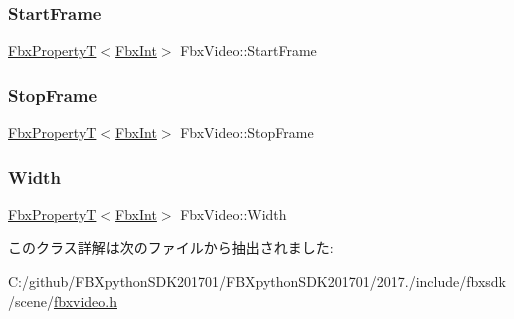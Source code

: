 \subsubsection{\texorpdfstring{Start\+Frame}{StartFrame}}
{\footnotesize\ttfamily \hyperlink{class_fbx_property_t}{Fbx\+PropertyT}$<$\hyperlink{fbxtypes_8h_a088fa96de3b0b3ea69f0f6afef525dfb}{Fbx\+Int}$>$ Fbx\+Video\+::\+Start\+Frame}

\mbox{\label{class_fbx_video_aab5d673b818ce8a797ac47851a34e996}} 
\subsubsection{\texorpdfstring{Stop\+Frame}{StopFrame}}
{\footnotesize\ttfamily \hyperlink{class_fbx_property_t}{Fbx\+PropertyT}$<$\hyperlink{fbxtypes_8h_a088fa96de3b0b3ea69f0f6afef525dfb}{Fbx\+Int}$>$ Fbx\+Video\+::\+Stop\+Frame}

\mbox{\label{class_fbx_video_a9f1d9f9874ac3a9274a754cfb311fc30}} 
\subsubsection{\texorpdfstring{Width}{Width}}
{\footnotesize\ttfamily \hyperlink{class_fbx_property_t}{Fbx\+PropertyT}$<$\hyperlink{fbxtypes_8h_a088fa96de3b0b3ea69f0f6afef525dfb}{Fbx\+Int}$>$ Fbx\+Video\+::\+Width}



このクラス詳解は次のファイルから抽出されました\+:\begin{DoxyCompactItemize}
\item 
C\+:/github/\+F\+B\+Xpython\+S\+D\+K201701/\+F\+B\+Xpython\+S\+D\+K201701/2017./include/fbxsdk/scene/\hyperlink{fbxvideo_8h}{fbxvideo.\+h}\end{DoxyCompactItemize}
